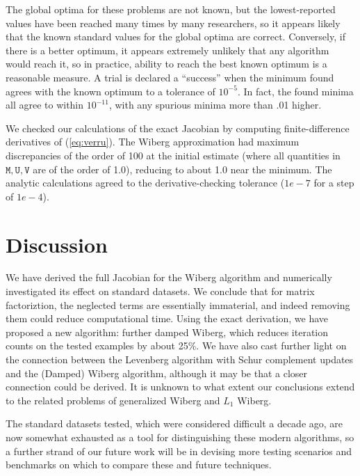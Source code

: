 \documentclass[runningheads]{llncs}
\def\eqref#1{(\ref{eq:#1})}
\def\m#1{\ensuremath{\mathtt{#1}}}
\def\mU{\m U}
\def\mV{\m V}
\def\mM{\m M}
\begin{document}
The global optima for these problems are not known, but the lowest-reported values have been reached many times by many researchers, so it appears likely that the known standard values for the global optima are correct.   Conversely, if there is a better optimum, it appears extremely unlikely that any algorithm would reach it, so in practice, ability to reach the best known optimum is a reasonable measure.  A trial is declared a ``success'' when the minimum found agrees with the known optimum to a tolerance of $10^{-5}$.   In fact, the found minima all agree to within $10^{-11}$, with any spurious minima more than .01 higher.

We checked our calculations of the exact Jacobian by computing finite-difference derivatives of \eqref{verru}.   The Wiberg approximation had maximum discrepancies of the order of 100 at the initial estimate (where all quantities in $\mM, \mU, \mV$ are of the order of 1.0), reducing to about 1.0 near the minimum.  The analytic calculations agreed to the derivative-checking tolerance ($1e-7$ for a step of $1e-4$).

\section{Discussion}
We have derived the full Jacobian for the Wiberg algorithm and numerically investigated its effect on standard datasets.   We conclude that for matrix factoriztion, the neglected terms are essentially immaterial, and indeed removing them could reduce computational time.   Using the exact derivation, we have proposed a new algorithm: further damped Wiberg, which reduces iteration counts on the tested examples by about 25\%.   We have also cast further light on the connection between the Levenberg algorithm with Schur complement updates and the (Damped) Wiberg algorithm, although it may be that a closer connection could be derived.   It is unknown to what extent our conclusions extend to the related problems of generalized Wiberg and $L_1$ Wiberg.

The standard datasets tested, which were considered difficult a decade ago, are now somewhat exhausted as a tool for distinguishing these modern algorithms, so a further strand of our future work will be in devising more testing scenarios and benchmarks on which to compare these and future techniques.

\appendix
\end{document}

